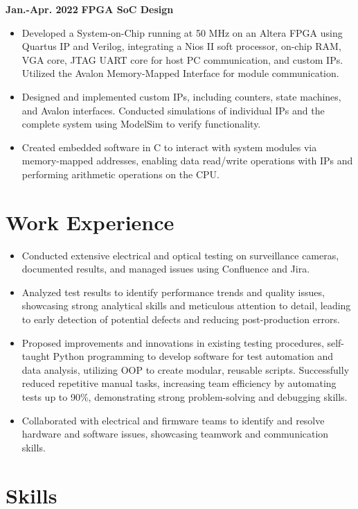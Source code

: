 \documentclass[11pt,a4paper,sans]{moderncv}
\begin{document}
\cventry
{\textnormal{\textbf{Jan.-Apr. 2022}}}
{\textnormal{\textbf{FPGA SoC Design}}}
{}{}{}
{
    \begin{itemize}
    \item Developed a System-on-Chip running at 50 MHz on an Altera FPGA using Quartus IP and Verilog, integrating a Nios II soft processor, on-chip RAM, VGA core, JTAG UART core for host PC communication, and custom IPs. Utilized the Avalon Memory-Mapped Interface for module communication.
    \item Designed and implemented custom IPs, including counters, state machines, and Avalon interfaces. Conducted simulations of individual IPs and the complete system using ModelSim to verify functionality.
    \item Created embedded software in C to interact with system modules via memory-mapped addresses, enabling data read/write operations with IPs and performing arithmetic operations on the CPU.
    \end{itemize}
}

\vspace{-0.3cm} 

\section{Work Experience}
{
    \begin{itemize}
    \item Conducted extensive electrical and optical testing on surveillance cameras, documented results, and managed issues using Confluence and Jira.
    \item Analyzed test results to identify performance trends and quality issues, showcasing strong analytical skills and meticulous attention to detail, leading to early detection of potential defects and reducing post-production errors.
    \item Proposed improvements and innovations in existing testing procedures, self-taught Python programming to develop software for test automation and data analysis, utilizing OOP to create modular, reusable scripts. Successfully reduced repetitive manual tasks, increasing team efficiency by automating tests up to 90\%, demonstrating strong problem-solving and debugging skills.
    \item Collaborated with electrical and firmware teams to identify and resolve hardware and software issues, showcasing teamwork and communication skills.
    \end{itemize}
}
\vspace{-0.2cm} 

\section{Skills}
\end{document}
